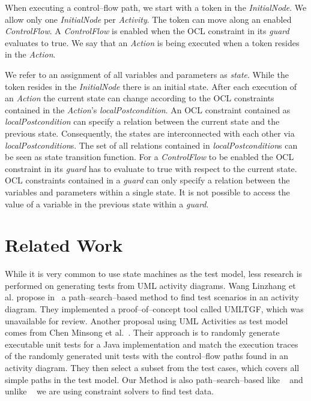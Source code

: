 \documentclass[runningheads,a4paper]{llncs}%
\newcommand{\UMLType}[1]{\textsf{\textit{#1}}} %
\newcommand{\UMLReference}[1]{\textsf{\textit{#1}}} %
\begin{document}
When executing a control--flow path, we start with a token in the
\UMLType{InitialNode}. We allow only one \UMLType{InitialNode} per
\UMLType{Activity}. The token can move along an enabled \UMLType{ControlFlow}. A
\UMLType{ControlFlow} is enabled when the OCL constraint in its
\UMLReference{guard} evaluates to true. We say that an \UMLType{Action} is being
executed when a token resides in the \UMLType{Action}.

We refer to an assignment of all variables and parameters as \emph{state}. While
the token resides in the \UMLType{InitialNode} there is an initial state. After
each execution of an \UMLType{Action} the current state can change according to
the OCL constraints contained in the \UMLType{Action}'s
\UMLReference{localPostcondition}. An OCL constraint contained as
\UMLType{localPostcondition} can specify a relation between the current state
and the previous state. Consequently, the states are interconnected with each
other via \UMLReference{localPostcondition}s. The set of all relations contained
in \UMLType{localPostcondition}s can be seen as state transition function. For a
\UMLType{ControlFlow} to be enabled the OCL constraint in its
\UMLReference{guard} has to evaluate to true with respect to the current state.
OCL constraints contained in a \UMLReference{guard} can only specify a relation
between the variables and parameters within a single state. It is not possible
to access the value of a variable in the previous state within a
\UMLReference{guard}.%

\section{Related Work}%
\label{sec:LiteratureReview}%
While it is very common to use state machines as the test model, less research
is performed on generating tests from UML activity diagrams. Wang Linzhang et
al. propose in~\cite{Linzhang04GeneratingTestCasefromActivityGrayBoxMethod} a
path--search--based method to find test scenarios in an activity diagram.
They implemented a proof--of--concept tool called UMLTGF, which was unavailable
for review. Another proposal using UML Activities as test model comes from Chen
Minsong et al.~\cite{mingsong2006automatic}. Their approach is to randomly
generate executable unit tests for a Java implementation and match the execution
traces of the randomly generated unit tests with the control--flow paths found
in an activity diagram. They then select a subset from the test cases, which
covers all simple paths in the test model. Our Method is also path--search--based like ~\cite{Linzhang04GeneratingTestCasefromActivityGrayBoxMethod} and unlike ~\cite{mingsong2006automatic} we are using constraint solvers to find test data.
\end{document}
